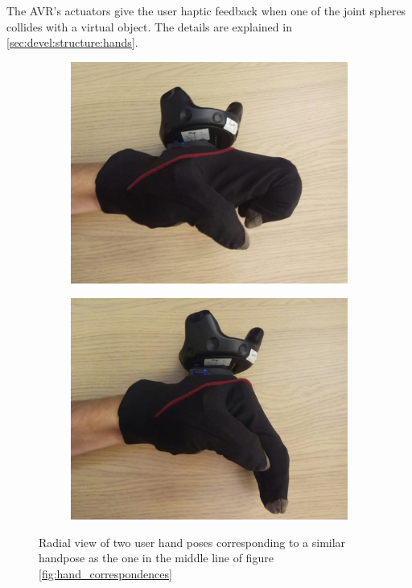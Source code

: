 \documentclass[hyperref, bachelorofscience]{cgvpub}
\begin{document}
The \Gls{AVR}'s actuators give the user haptic feedback when one of the joint spheres collides with a virtual object. The details are explained in \ref{sec:devel:structure:hands}.

\begin{figure}
	\centering
	\begin{subfigure}{.4\linewidth}
		\includegraphics[width=\linewidth]{../pics/hand_radial_natfake1}
	\end{subfigure}
	\hspace{1cm}
	\begin{subfigure}{.4\linewidth}
		\includegraphics[width=\linewidth]{../pics/hand_radial_natfake2}
	\end{subfigure}
	\caption{Radial view of two user hand poses corresponding to a similar handpose as the one in the middle line of figure \ref{fig:hand_correspondences}}
	\label{fig:natfake}
\end{figure}
\end{document}
